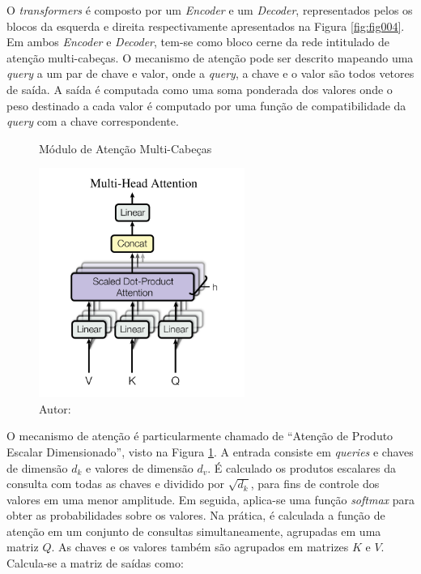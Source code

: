 O \textit{transformers} é composto por um \textit{Encoder} e um \textit{Decoder}, representados pelos os blocos da esquerda e direita respectivamente apresentados na Figura \ref{fig:fig004}. Em ambos \textit{Encoder} e \textit{Decoder}, tem-se como bloco cerne da rede intitulado de atenção multi-cabeças. O mecanismo de atenção pode ser descrito mapeando uma \textit{query} a um par de chave e valor, onde a \textit{query}, a chave e o valor são todos vetores de saída. A saída é computada como uma soma ponderada dos valores onde o peso destinado a cada valor é computado por uma função de compatibilidade da \textit{query} com a chave correspondente.

\begin{figure}[htbp]
    \centering
    \caption{Módulo de Atenção Multi-Cabeças}
    \includegraphics[width=0.6\textwidth]{figures/fig005.png}
    \caption*{Autor:\cite{vaswaniAttentionAllYou2023}}
    \label{fig:fig005}
\end{figure}

O mecanismo de atenção é particularmente chamado de ``Atenção de Produto Escalar Dimensionado'', visto na Figura \ref{fig:fig005}. A entrada consiste em \textit{queries} e chaves de dimensão $d_{k}$ e valores de dimensão $d_{v}$. É calculado os produtos escalares da consulta com todas as chaves e dividido por $\sqrt{d_{k}}$, para fins de controle dos valores em uma menor amplitude. Em seguida, aplica-se uma função \textit{softmax} para obter as probabilidades sobre os valores. Na prática, é calculada a função de atenção em um conjunto de consultas simultaneamente, agrupadas em uma matriz $Q$. As chaves e os valores também são agrupados em matrizes $K$ e $V$. Calcula-se a matriz de saídas como:

